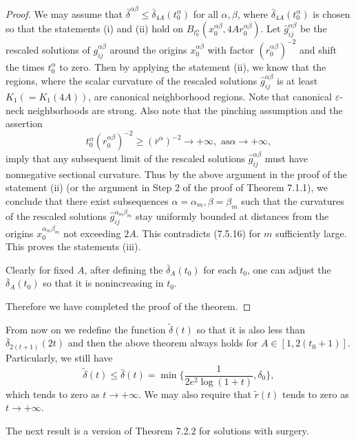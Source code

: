 \begin{proof}
We may assume that $\bar{\delta}^{\alpha\beta}\leq
\bar{\delta}_{4A}(t^{\alpha}_0)$ for all $\alpha,\beta$, where
$\bar{\delta}_{4A}(t^{\alpha}_0)$ is chosen so that the statements
(i) and (ii) hold on
$B_{t^{\alpha}_0}(x^{\alpha\beta}_0,4Ar^{\alpha\beta}_0)$. Let
$\hat{g}^{\alpha\beta}_{ij}$ be the rescaled solutions of
$g^{\alpha\beta}_{ij}$ around the origins $x^{\alpha\beta}_0$ with
factor $(r^{\alpha\beta}_0)^{-2}$ and shift the times
$t^{\alpha}_0$ to zero. Then by applying the statement (ii), we
know that the regions, where the scalar curvature of the rescaled
solutions $\hat{g}^{\alpha\beta}_{ij}$ is at least
$K_1(=K_1(4A))$, are canonical neighborhood regions. Note that
canonical $\varepsilon$-neck neighborhoods are strong. Also note
that the pinching assumption and the assertion
$$
t^{\alpha}_0(r^{\alpha\beta}_0)^{-2} \geq
(\bar{r}^{\alpha})^{-2}\rightarrow+\infty, \mbox{ as
}\alpha\rightarrow+\infty,
$$
imply that any subsequent limit of the rescaled solutions
$\hat{g}^{\alpha\beta}_{ij}$ must have nonnegative sectional
curvature. Thus by the above argument in the proof of the
statement (ii) (or the argument in Step 2 of the proof of Theorem
7.1.1), we conclude that there exist subsequences
$\alpha=\alpha_m,\beta=\beta_m$ such that the curvatures of the
rescaled solutions $\hat{g}^{\alpha_m\beta_m}_{ij}$ stay uniformly
bounded at distances from the origins $x^{\alpha_m\beta_m}_0$ not
exceeding $2A$. This contradicts (7.5.16) for $m$ sufficiently
large. This proves the statements (iii).

Clearly for fixed $A$, after defining the $\bar{\delta}_A(t_0)$
for each $t_0$, one can adjust the $\bar{\delta}_A(t_0)$ so that
it is nonincreasing in $t_0$.

Therefore we have completed the proof of the theorem.
\end{proof}

{}From now on we redefine the function $\widetilde{\delta}(t)$  so
that it is also less than $\bar{\delta}_{2(t+1)}(2t)$ and then the
above theorem always holds for $A \in [1,2(t_0+1)]$. Particularly,
we still have
$$
\widetilde{\delta}(t)\leq \bar{\delta}(t) = \min
\{\frac{1}{{2e^2\log(1+t)}}, \delta_0\},
$$
which tends to zero as $t\rightarrow+\infty$. We may also require
that $\widetilde{r}(t)$ tends to zero as $t\rightarrow+\infty$.

The next result is a version of Theorem 7.2.2 for solutions with
surgery.

